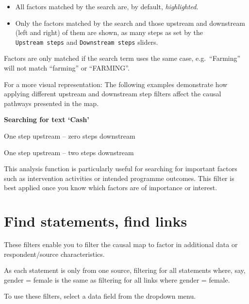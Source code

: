 \documentclass[
]{book}
\providecommand{\tightlist}{%
  \setlength{\itemsep}{0pt}\setlength{\parskip}{0pt}}
\begin{document}
\begin{itemize}
\tightlist
\item
  All factors matched by the search are, by default, \emph{highlighted}.
\item
  Only the factors matched by the search and those upstream and downstream (left and right) of them are shown, as many steps as set by the \texttt{Upstream\ steps} and \texttt{Downstream\ steps} sliders.
\end{itemize}

Factors are only matched if the search term uses the same case, e.g.~``Farming'' will not match ``farming'' or ``FARMING''.

For a more visual representation: The following examples demonstrate how applying different upstream and downstream step filters affect the causal pathways presented in the map.

\textbf{Searching for text `Cash'}

One step upstream -- zero steps downstream

One step upstream -- two steps downstream

This analysis function is particularly useful for searching for important factors such as intervention activities or intended programme outcomes. This filter is best applied once you know which factors are of importance or interest.

\hypertarget{xfind-statements-links}{%
\section{Find statements, find links}\label{xfind-statements-links}}

These filters enable you to filter the causal map to factor in additional data or respondent/source characteristics.

As each statement is only from one source, filtering for all statements where, say, gender = female is the same as filtering for all links where gender = female.

To use these filters, select a data field from the dropdown menu.
\end{document}
